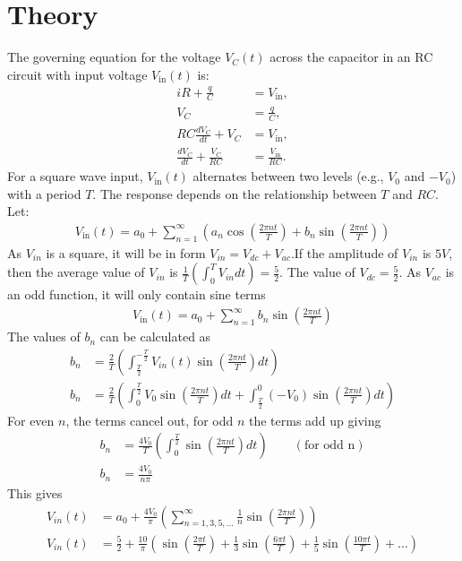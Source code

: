 \documentclass[12pt]{article}
\newcommand{\brak}[1]{\ensuremath{\left(#1\right)}}
\begin{document}
\section{Theory}
The governing equation for the voltage $V_C(t)$ across the capacitor in an RC circuit with input voltage $V_{\text{in}}(t)$ is:
\begin{align}
    iR + \frac{q}{C} &= V_{\text{in}}, \\
    V_C &= \frac{q}{C}, \\
    RC \frac{dV_C}{dt} + V_C &= V_{\text{in}}, \\
    \frac{dV_C}{dt} + \frac{V_C}{RC} &= \frac{V_{\text{in}}}{RC}.
\end{align}
For a square wave input, $V_{\text{in}}(t)$ alternates between two levels (e.g., $V_0$ and $-V_0$) with a period $T$. The response depends on the relationship between $T$ and $RC$. Let:
\begin{align}
    V_{\text{in}}\brak{t} =a_0+\sum_{n=1}^{\infty}\brak{a_n \cos\brak{\frac{2\pi nt}{T}}+b_n\sin\brak{\frac{2\pi nt}{T}}}
\end{align}
As $V_{in}$ is a square, it will be in form $V_{in} = V_{dc} + V_{ac}$.\newline If the amplitude of $V_{in}$ is $5V$, then the average value of $V_{in}$ is  $\frac{1}{T}\brak{\int_{0}^{T}V_{in}dt} = \frac{5}{2}$. The value of $V_{dc} = \frac{5}{2}$.\newline
As $V_{ac}$ is an odd function, it will only contain sine terms
\begin{align}
	 V_{\text{in}}\brak{t} =a_0+\sum_{n=1}^{\infty}b_n\sin\brak{\frac{2\pi nt}{T}}
\end{align}
The values of $b_n$ can be calculated as
\begin{align}
	b_n &= \frac{2}{T}\brak{\int_{\frac{T}{2}}^{-\frac{T}{2}}V_{in}\brak{t}\sin\brak{\frac{2\pi nt}{T}}dt}\\
	b_n &= \frac{2}{T}\brak{\int_{0}^{\frac{T}{2}}V_0 \sin\brak{\frac{2\pi nt}{T}}dt + \int_{\frac{T}{2}}^{0}\brak{-V_0}\sin\brak{\frac{2\pi nt}{T}}dt}		
\end{align}
For even $n$, the terms cancel out, for odd $n$ the terms add up giving
\begin{align}
	b_n &= \frac{4V_0}{T}\brak{\int_{0}^{\frac{T}{2}}\sin\brak{\frac{2\pi nt}{T}}dt} \qquad \brak{\text{for odd n}}\\
	b_n &= \frac{4V_0}{n\pi}
\end{align}
This gives
\begin{align}
	V_{in}\brak{t} &= a_0 + \frac{4V_0}{\pi}\brak{\sum_{n = 1,3,5,\dots}^{\infty}\frac{1}{n}\sin\brak{\frac{2\pi nt}{T}}}\\
	V_{in}\brak{t} &= \frac{5}{2} + \frac{10}{\pi}\brak{\sin\brak{\frac{2\pi t}{T}}+\frac{1}{3}\sin\brak{\frac{6\pi t}{T}}+\frac{1}{5}\sin\brak{\frac{10\pi t}{T}}+\dots}
\end{align}
\end{document}
